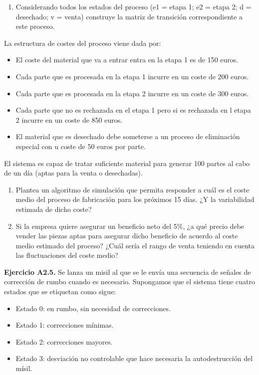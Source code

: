 \documentclass[
]{book}
\providecommand{\tightlist}{%
  \setlength{\itemsep}{0pt}\setlength{\parskip}{0pt}}
\theoremstyle{definition}
\theoremstyle{definition}
\theoremstyle{definition}
\theoremstyle{definition}
\theoremstyle{remark}
\begin{document}
\begin{enumerate}
\def\labelenumi{\arabic{enumi}.}
\tightlist
\item
  Considerando todos los estados del proceso (e1 = etapa 1; e2 = etapa 2; d = desechado; v = venta) construye la matriz de transición correspondiente a este proceso.
\end{enumerate}

La estructura de costes del proceso viene dada por:

\begin{itemize}
\tightlist
\item
  El coste del material que va a entrar entra en la etapa 1 es de 150 euros.
\item
  Cada parte que es procesada en la etapa 1 incurre en un coste de 200 euros.
\item
  Cada parte que es procesada en la etapa 2 incurre en un coste de 300 euros.
\item
  Cada parte que no es rechazada en el etapa 1 pero si es rechazada en l etapa 2 incurre en un coste de 850 euros.
\item
  El material que es desechado debe someterse a un proceso de eliminación especial con u coste de 50 euros por parte.
\end{itemize}

El sistema es capaz de tratar suficiente material para generar 100 partes al cabo de un día (aptas para la venta o desechadas).

\begin{enumerate}
\def\labelenumi{\arabic{enumi}.}
\setcounter{enumi}{1}
\tightlist
\item
  Plantea un algoritmo de simulación que permita responder a cuál es el coste medio del proceso de fabricación para los próximos 15 días. ¿Y la variabilidad estimada de dicho coste?
\item
  Si la empresa quiere asegurar un beneficio neto del 5\%, ¿a qué precio debe vender las piezas aptas para asegurar dicho beneficio de acuerdo al coste medio estimado del proceso? ¿Cuál sería el rango de venta teniendo en cuenta las fluctuaciones del coste medio?
\end{enumerate}

\textbf{Ejercicio A2.5.} Se lanza un misil al que se le envía una secuencia de señales de corrección de rumbo cuando es necesario. Supongamos que el sistema tiene cuatro estados que se etiquetan como sigue:

\begin{itemize}
\tightlist
\item
  Estado 0: en rumbo, sin necesidad de correcciones.
\item
  Estado 1: correcciones mínimas.
\item
  Estado 2: correcciones mayores.
\item
  Estado 3: desviación no controlable que hace necesaria la autodestrucción del mísil.
\end{itemize}
\end{document}
